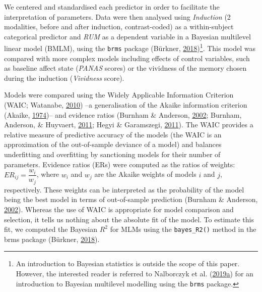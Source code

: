\documentclass[a4paper,12pt,twoside,openright,oldfontcommands]{memoir}
\let\rmarkdownfootnote\footnote%
\def\footnote{\protect\rmarkdownfootnote}
\begin{document}
We centered and standardised each predictor in order to facilitate the interpretation of parameters. Data were then analysed using \emph{Induction} (2 modalities, before and after induction, contrast-coded) as a within-subject categorical predictor and \emph{RUM} as a dependent variable in a Bayesian multilevel linear model (BMLM), using the \texttt{brms} package (Bürkner, \protect\hyperlink{ref-R-brms}{2018})\footnote{An introduction to Bayesian statistics is outside the scope of this paper. However, the interested reader is referred to Nalborczyk et al. (\protect\hyperlink{ref-nalborczyk_introduction_2019}{2019}\protect\hyperlink{ref-nalborczyk_introduction_2019}{a}) for an introduction to Bayesian multilevel modelling using the \texttt{brms} package.}. This model was compared with more complex models including effects of control variables, such as baseline affect state (\emph{PANAS} scores) or the vividness of the memory chosen during the induction (\emph{Vividness} score).

Models were compared using the Widely Applicable Information Criterion (WAIC; Watanabe, \protect\hyperlink{ref-watanabe_asymptotic_2010}{2010}) --a generalisation of the Akaike information criterion (Akaike, \protect\hyperlink{ref-akaike_new_1974}{1974})-- and evidence ratios (Burnham \& Anderson, \protect\hyperlink{ref-burnham_model_2002}{2002}; Burnham, Anderson, \& Huyvaert, \protect\hyperlink{ref-burnham_aic_2011}{2011}; Hegyi \& Garamszegi, \protect\hyperlink{ref-hegyi_using_2011}{2011}). The WAIC provides a relative measure of predictive accuracy of the models (the WAIC is an approximation of the out-of-sample deviance of a model) and balances underfitting and overfitting by sanctioning models for their number of parameters. Evidence ratios (ERs) were computed as the ratios of weights: \(ER_{ij} = \dfrac{w_{i}}{w_{j}}\), where \(w_{i}\) and \(w_{j}\) are the Akaike weights of models \(i\) and \(j\), respectively. These weights can be interpreted as the probability of the model being the best model in terms of out-of-sample prediction (Burnham \& Anderson, \protect\hyperlink{ref-burnham_model_2002}{2002}). Whereas the use of WAIC is appropriate for model comparison and selection, it tells us nothing about the absolute fit of the model. To estimate this fit, we computed the Bayesian \(R^2\) for MLMs using the \texttt{bayes\_R2()} method in the brms package (Bürkner, \protect\hyperlink{ref-R-brms}{2018}).
\end{document}
